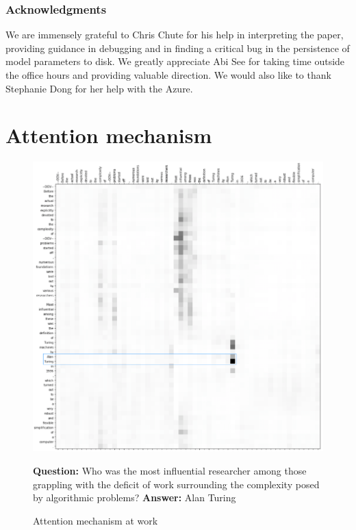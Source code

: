 \documentclass{article}
\begin{document}
\subsubsection*{Acknowledgments}
We are immensely grateful to Chris Chute for his help in interpreting the paper, providing guidance in debugging and in finding a critical bug in the persistence of model parameters to disk. We greatly appreciate Abi See for taking time outside the office hours and providing valuable direction. We would also like to thank Stephanie Dong for her help with the Azure.  




 \cleardoublepage

\appendix
\section{Attention mechanism}
\label{appendix:a}
\begin{figure}[h]
  \vspace{-10pt}
  \centering
  \includegraphics[scale=0.5]{../images/attention.png}
  \caption{Attention mechanism at work}
  \tiny
\textbf{Question:} Who was the most influential researcher among those grappling with the deficit of work surrounding the complexity posed by algorithmic problems?
\textbf{Answer:} Alan Turing
  \label{attention-full-figure}
\end{figure} 
\end{document}
